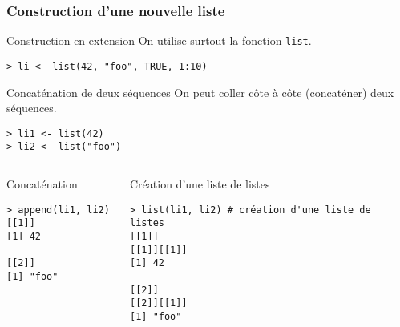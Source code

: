 \documentclass[10pt]{beamer}
\begin{document}
\begin{frame}[fragile]
  \frametitle{Construction d'une nouvelle liste}
  \begin{alertblock}{Construction en extension}
    On utilise surtout la fonction \alert{\texttt{list}}.
    \begin{lstlisting}
> li <- list(42, "foo", TRUE, 1:10)
\end{lstlisting}
  \end{alertblock}

  \begin{block}{Concaténation de deux séquences}
    On peut coller côte à côte (concaténer) deux séquences.
    \begin{lstlisting}
> li1 <- list(42)
> li2 <- list("foo")
\end{lstlisting}
\end{block}    

\vspace{-15pt}
\begin{columns}[t]
  \begin{column}{0.48\textwidth}
    \begin{block}{Concaténation}
    \begin{lstlisting}[style=block]
> append(li1, li2) 
[[1]]
[1] 42

[[2]]
[1] "foo"
\end{lstlisting}
\end{block}

\end{column}
\begin{column}{0.48\textwidth}
  \begin{block}{Création d'une liste de listes}
    \begin{lstlisting}[style=block]
> list(li1, li2) # création d'une liste de listes 
[[1]]
[[1]][[1]]
[1] 42

[[2]]
[[2]][[1]]
[1] "foo"
\end{lstlisting}
  \end{block}
\end{column}
\end{columns}


\end{frame}
\end{document}
